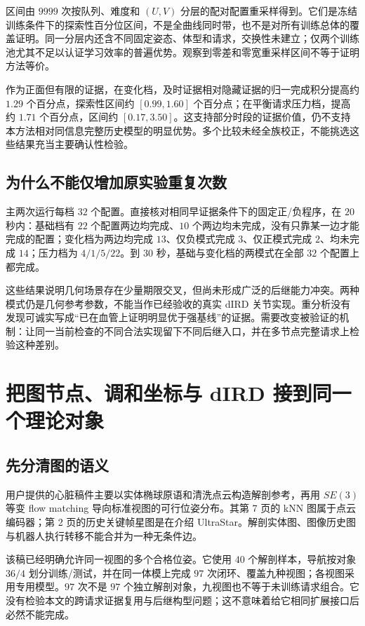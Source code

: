 \documentclass[11pt,a4paper,fontset=fandol]{ctexart}
\theoremstyle{definition}
\theoremstyle{remark}\newtheorem{remark}[theorem]{说明}
\numberwithin{equation}{section}
\begin{document}
区间由 $9999$ 次按队列、难度和 $(U,V)$ 分层的配对配置重采样得到。它们是冻结训练条件下的探索性百分位区间，不是全曲线同时带，也不是对所有训练总体的覆盖证明。同一分层内还含不同固定姿态、体型和请求，交换性未建立；仅两个训练池尤其不足以认证学习效率的普遍优势。观察到零差和零宽重采样区间不等于证明方法等价。

作为正面但有限的证据，在变化档，及时证据相对隐藏证据的归一完成积分提高约 $1.29$ 个百分点，探索性区间约 $[0.99,1.60]$ 个百分点；在平衡请求压力档，提高约 $1.71$ 个百分点，区间约 $[0.17,3.50]$。这支持部分时段的证据价值，仍不支持本方法相对同信息完整历史模型的明显优势。多个比较未经全族校正，不能挑选这些结果充当主要确认性检验。

\subsection{为什么不能仅增加原实验重复次数}
主两次运行每档 $32$ 个配置。直接核对相同早证据条件下的固定正/负程序，在 $20$ 秒内：基础档有 $22$ 个配置两边均完成、$10$ 个两边均未完成，没有只靠某一边才能完成的配置；变化档为两边均完成 $13$、仅负模式完成 $3$、仅正模式完成 $2$、均未完成 $14$；压力档为 $4/1/5/22$。到 $30$ 秒，基础与变化档的两模式在全部 $32$ 个配置上都完成。

这些结果说明几何场景存在少量期限交叉，但尚未形成广泛的后继能力冲突。两种模式仍是几何参考参数，不能当作已经验收的真实 dIRD 关节实现。重分析没有发现可诚实写成“已在血管上证明明显优于强基线”的证据。需要改变被验证的机制：让同一当前检查的不同合法实现留下不同后继入口，并在多节点完整请求上检验这种差别。

\section{把图节点、调和坐标与 dIRD 接到同一个理论对象}
\label{sec:graph_interface}
\subsection{先分清图的语义}
用户提供的心脏稿件\cite{attachedcardiac}主要以实体椭球原语和清洗点云构造解剖参考，再用 $SE(3)$ 等变 flow matching 导向标准视图的可行位姿分布。其第 7 页的 kNN 图属于点云编码器；第 2 页的历史关键帧星图是在介绍 UltraStar\cite{ultrastar}。解剖实体图、图像历史图与机器人执行转移不能合并为一种无条件边。

该稿已经明确允许同一视图的多个合格位姿。它使用 $40$ 个解剖样本，导航按对象 $36/4$ 划分训练/测试，并在同一体模上完成 $97$ 次闭环、覆盖九种视图；各视图采用专用模型。$97$ 次不是 $97$ 个独立解剖对象，九视图也不等于未训练请求组合。它没有检验本文的跨请求证据复用与后继构型问题；这不意味着给它相同扩展接口后必然不能完成。
\end{document}
